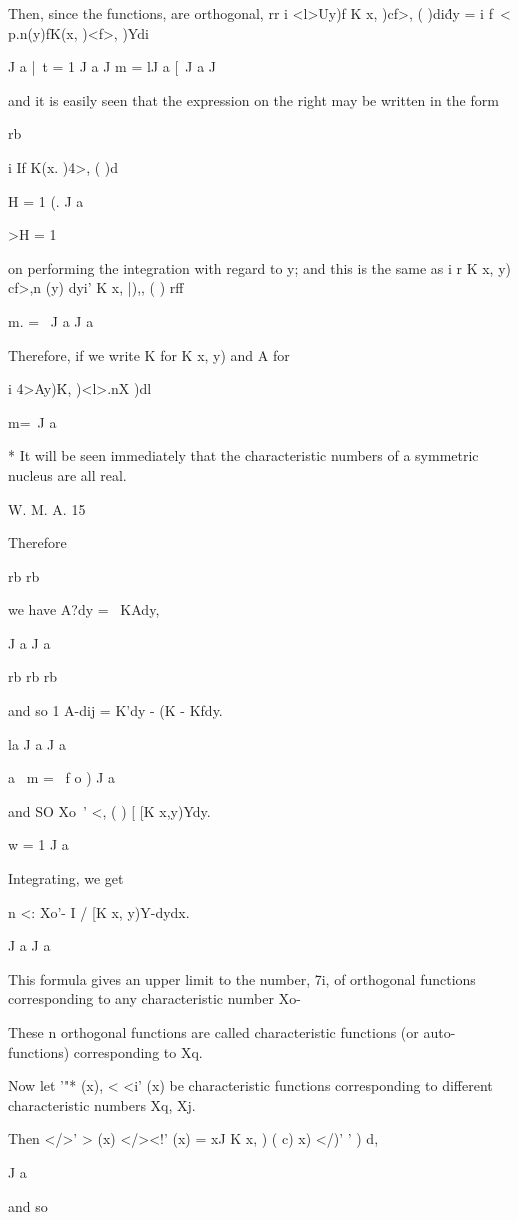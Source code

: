 {Then, since the functions, are orthogonal, rr i <l>Uy)f K x, )cf>, (
)di\'dy = i f\ < p.n(y)fK(x, )<f>, )Ydi

J a |\ t = 1 J a J m = lJ a [\ J a J

and it is easily seen that the expression on the right may be written
in the form

rb

i If K(x. )4>, ( )d

H = 1 (. J a

>H = 1

on performing the integration with regard to y; and this is the same
as i r K x, y) cf>,n (y) dyi' K x, |),, ( ) rff

m. = \ J a J a

Therefore, if we write K for K x, y) and A for

i 4>Ay)\' K, )<l>.nX )dl

m=\ J a

* It will be seen immediately that the characteristic numbers of a
symmetric nucleus are all real.

W. M. A. 15

Therefore

%
%

rb rb

we have A?dy = \ KAdy,

J a J a

rb rb rb

and so 1 A-dij = K'dy - (K - Kfdy.

la J a J a

a \ m = \ f o ) J a

and SO Xo~' <, ( ) [ [K x,y)Ydy.

w = 1 J a

Integrating, we get

n <: Xo'- I / [K x, y)Y-dydx.

J a J a

This formula gives an upper limit to the number, 7i, of orthogonal
functions corresponding to any characteristic number Xo-

These n orthogonal functions are called characteristic functions (or
auto- functions) corresponding to Xq.

Now let '"* (x), < <i' (x) be characteristic functions corresponding
to different characteristic numbers Xq, Xj.

Then </>' > (x) </><!' (x) = xJ K x, ) ( c) x) </)' ' ) d,

J a

and so

}

